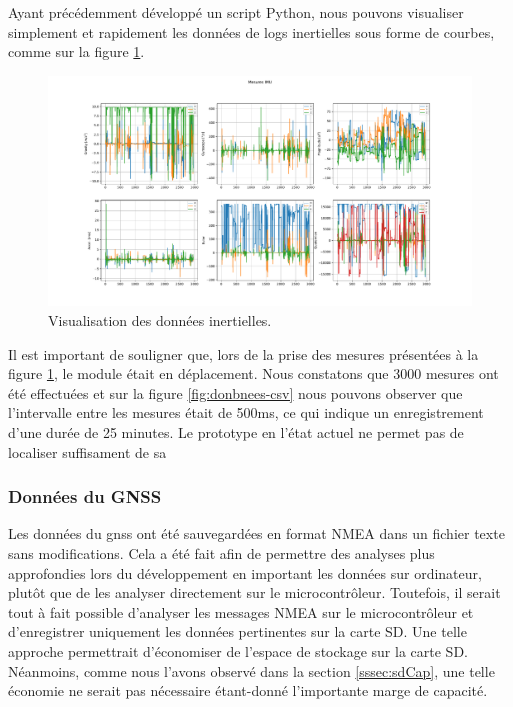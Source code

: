Ayant précédemment développé un script Python, nous pouvons visualiser simplement et rapidement les données de logs inertielles sous forme de courbes, comme sur la figure \ref{fig:mesures}.

\begin{figure}[h]
	\centering
	\includegraphics[width=1\linewidth]{../figures/application/mesures}
	\caption{Visualisation des données inertielles.}
	\label{fig:mesures}
\end{figure}

Il est important de souligner que, lors de la prise des mesures présentées à la figure \ref{fig:mesures}, le module était en déplacement. Nous constatons que 3000 mesures ont été effectuées et sur la figure \ref{fig:donbnees-csv} nous pouvons observer que l'intervalle entre les mesures était de 500ms, ce qui indique un enregistrement d'une durée de 25 minutes. Le prototype en l'état actuel ne permet pas de localiser suffisament de sa

\subsubsection{Données du GNSS} \label{sssec:GNSS-data}

Les données du \gls{gnss} ont été sauvegardées en format NMEA dans un fichier texte sans modifications. Cela a été fait afin de permettre des analyses plus approfondies lors du développement en important les données sur ordinateur, plutôt que de les analyser directement sur le microcontrôleur. Toutefois, il serait tout à fait possible d'analyser les messages NMEA sur le microcontrôleur et d'enregistrer uniquement les données pertinentes sur la carte SD. Une telle approche permettrait d'économiser de l'espace de stockage sur la carte SD. Néanmoins, comme nous l'avons observé dans la section \ref{sssec:sdCap}, une telle économie ne serait pas nécessaire étant-donné l'importante marge de capacité. 

